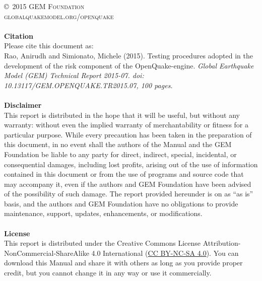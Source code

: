 \documentclass[11pt,fleqn]{book} %
\begin{document}
\noindent \copyright\ \textsc{2015 GEM Foundation}\\ %
\noindent \textsc{globalquakemodel.org/openquake}\\ %
\noindent \hfill\\
\noindent
   {\textbf{Citation}} \hfill \\
   Please cite this document as: \hfill \\
   Rao, Anirudh and Simionato, Michele (2015). 
   Testing procedures adopted in the development of the risk 
   component of the OpenQuake-engine. 
   \textit{Global Earthquake Model (GEM) Technical Report 2015-07. 
   doi: 10.13117/GEM.OPENQUAKE.TR2015.07, 100 pages.} \hfill \\
\noindent \hfill\\
\noindent
   {\bf{Disclaimer}} \hfill \\
   This report is distributed in the hope that it will be 
   useful, but without any warranty: without even the implied warranty of 
   merchantability or fitness for a particular purpose. While every precaution 
   has been taken in the preparation of this document, in no event shall the 
   authors of the Manual and the GEM Foundation be liable to any party for 
   direct, indirect, special, incidental, or consequential damages, including 
   lost profits, arising out of the use of information contained in this 
   document or from the use of programs and source code that may accompany it, 
   even if the authors and GEM Foundation have been advised of the possibility 
   of such damage. The report provided hereunder is on as ``as is'' basis, and the 
   authors and GEM Foundation have no obligations to provide maintenance, 
   support, updates, enhancements, or modifications. \hfill \\
\noindent \hfill\\
\noindent
   {\bf{License}} \hfill \\
   This report is distributed under the Creative Commons License 
   Attribution-NonCommercial-ShareAlike 4.0 International 
   (\href{http://creativecommons.org/licenses/by-nc-sa/4.0/}
   {CC BY-NC-SA 4.0}). 
   You can download this Manual and share it with 
   others as long as you provide proper credit, but you cannot change 
   it in any way or use it commercially.\hfill \\
\end{document}
